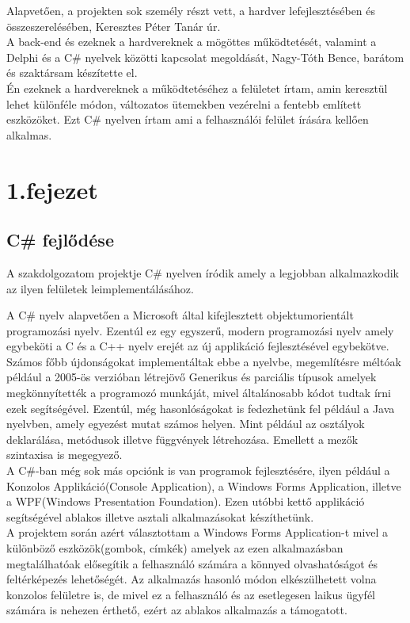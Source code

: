 \documentclass[tocnopagenum]{thesis-ekf}
\theoremstyle{definition}
\theoremstyle{remark}
\begin{document}

	Alapvetően, a projekten sok személy részt vett, a hardver lefejlesztésében és 
	összeszerelésében, Keresztes Péter Tanár úr. \\
	A back-end és ezeknek a hardvereknek a mögöttes működtetését, valamint a Delphi és a C\# nyelvek közötti kapcsolat megoldását, Nagy-Tóth Bence, barátom és szaktársam készítette el.
	\\
	Én ezeknek a hardvereknek a működtetéséhez a felületet írtam, amin keresztül lehet különféle módon, változatos ütemekben vezérelni a fentebb említett eszközöket. Ezt C\# nyelven írtam ami a felhasználói felület írására kellően alkalmas.
	
	

	\chapter*{1.fejezet}
	\section{C\# fejlődése}

	A szakdolgozatom projektje C\# nyelven íródik amely a legjobban alkalmazkodik az ilyen felületek leimplementálásához. 
	
	A C\# nyelv alapvetően a Microsoft által kifejlesztett objektumorientált programozási nyelv.
	Ezentúl ez egy egyszerű, modern programozási nyelv amely egybeköti a C és a C++ nyelv erejét az új applikáció fejlesztésével egybekötve. \cite{hejlsberg2003c}
	\\ 
	Számos főbb újdonságokat implementáltak ebbe a nyelvbe, megemlítésre méltóak például a 2005-ös verzióban létrejövő Generikus és parciális típusok amelyek megkönnyítették a programozó munkáját, mivel általánosabb kódot tudtak írni ezek segítségével.
	Ezentúl, még hasonlóságokat is fedezhetünk fel például a Java nyelvben, amely egyezést mutat számos helyen.
	Mint például az osztályok deklarálása, metódusok illetve függvények létrehozása. Emellett a mezők szintaxisa is megegyező.
	\\
	A C\#-ban még sok más opciónk is van programok fejlesztésére, ilyen például a Konzolos Applikáció(Console Application), a Windows Forms Application, illetve a WPF(Windows Presentation Foundation). Ezen utóbbi kettő applikáció segítségével ablakos illetve asztali alkalmazásokat készíthetünk.
	\\
	A projektem során azért választottam a Windows Forms Application-t mivel a különböző eszközök(gombok, címkék) amelyek az ezen alkalmazásban megtalálhatóak elősegítik a felhasználó számára a könnyed olvashatóságot és feltérképezés lehetőségét. Az alkalmazás hasonló módon elkészülhetett volna konzolos felületre is, de mivel ez a felhasználó és az esetlegesen laikus ügyfél számára is nehezen érthető, ezért az ablakos alkalmazás a támogatott.
	\\ 
\end{document}

